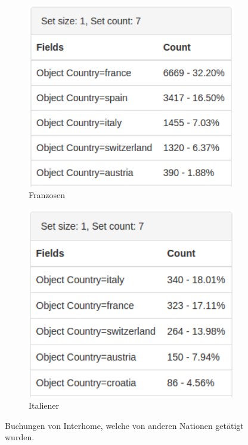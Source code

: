 \begin{figure}[H]
	\begin{subfigure}[t]{0.4\textwidth}
		\centering
		\includegraphics[width=1\textwidth]{images/hypothese3-2}
		\caption{Franzosen}
		\label{fig:testingfazit:testing:hypothesen:hypothese3:2:1}
	\end{subfigure} 
	\begin{subfigure}[t]{0.4\textwidth}
		\centering
		\includegraphics[width=1\textwidth]{images/hypothese3-3}
		\caption{Italiener}
		\label{fig:testingfazit:testing:hypothesen:hypothese3:2:2}
	\end{subfigure}
	\caption{Buchungen von Interhome, welche von anderen Nationen getätigt wurden.}
	\label{fig:testingfazit:testing:hypothesen:hypothese3:2}
\end{figure}

